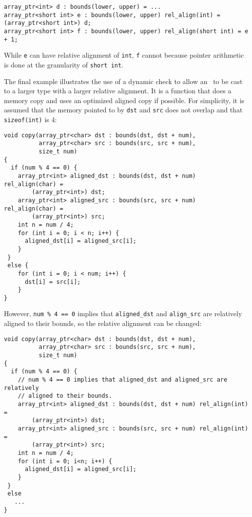 \begin{lstlisting}
array_ptr<int> d : bounds(lower, upper) = ...
array_ptr<short int> e : bounds(lower, upper) rel_align(int) = (array_ptr<short int>) d;
array_ptr<short int> f : bounds(lower, upper) rel_align(short int) = e + 1;
\end{lstlisting}

While \texttt{e} can have relative alignment of \texttt{int}, \texttt{f}
cannot because pointer arithmetic is done at the granularity of
\texttt{short int}.

The final example illustrates the use of a dynamic check to allow an
\arrayptrchar\ to be cast to a larger type with a larger relative alignment.
It is a function that does a memory copy and uses an optimized aligned copy if
possible.  For simplicity, it is assumed that the memory pointed to by
\texttt{dst} and \texttt{src} does not overlap and that \texttt{sizeof(int)} is 4:
\begin{lstlisting}
void copy(array_ptr<char> dst : bounds(dst, dst + num),
          array_ptr<char> src : bounds(src, src + num), 
          size_t num)
{
  if (num % 4 == 0) {
    array_ptr<int> aligned_dst : bounds(dst, dst + num) rel_align(char) =
        (array_ptr<int>) dst;
    array_ptr<int> aligned_src : bounds(src, src + num) rel_align(char) =
        (array_ptr<int>) src;
    int n = num / 4;
    for (int i = 0; i < n; i++) {
      aligned_dst[i] = aligned_src[i];
    }
 }
 else {
    for (int i = 0; i < num; i++) {
      dst[i] = src[i];
    }
}
\end{lstlisting}

However, \texttt{num \% 4 == 0} implies that \texttt{aligned\_dst} and
\texttt{align\_src} are relatively aligned to their bounds, so the
relative alignment can be changed:

\begin{lstlisting}
void copy(array_ptr<char> dst : bounds(dst, dst + num),
          array_ptr<char> src : bounds(src, src + num), 
          size_t num)
{
  if (num % 4 == 0) {
    // num % 4 == 0 implies that aligned_dst and aligned_src are relatively
    // aligned to their bounds.
    array_ptr<int> aligned_dst : bounds(dst, dst + num) rel_align(int) =
        (array_ptr<int>) dst;
    array_ptr<int> aligned_src : bounds(src, src + num) rel_align(int) =
        (array_ptr<int>) src;
    int n = num / 4;
    for (int i = 0; i<n; i++) {
      aligned_dst[i] = aligned_src[i];
    }
 }
 else  
   ...
}
\end{lstlisting}

